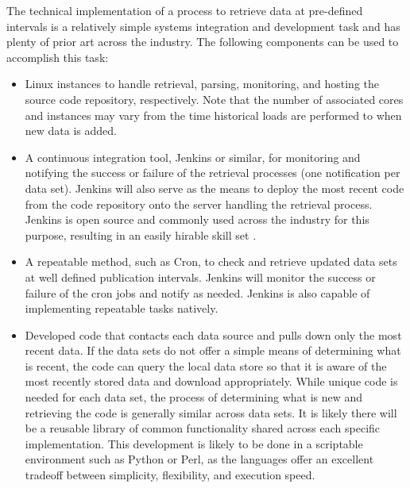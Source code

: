 The technical implementation of a process to retrieve data at pre-defined intervals is a relatively simple systems integration and development task and has plenty of prior art across the industry. The following components can be used to accomplish this task:
\begin{itemize}
	\item Linux instances to handle retrieval, parsing, monitoring, and hosting the source code repository, respectively. Note that the number of associated cores and instances may vary from the time historical loads are performed to when new data is added.
	\item A continuous integration tool, Jenkins or similar, for monitoring and notifying the success or failure of the retrieval processes (one notification per data set). Jenkins will also serve as the means to deploy the most recent code from the code repository onto the server handling the retrieval process. Jenkins is open source and commonly used across the industry for this purpose, resulting in an easily hirable skill set \cite{jenkins}.
	\item A repeatable method, such as Cron, to check and retrieve updated data sets at well defined publication intervals. Jenkins will monitor the success or failure of the cron jobs and notify as needed. Jenkins is also capable of implementing repeatable tasks natively.
	\item Developed code that contacts each data source and pulls down only the most recent data. If the data sets do not offer a simple means of determining what is recent, the code can query the local data store so that it is aware of the most recently stored data and download appropriately. While unique code is needed for each data set, the process of determining what is new and retrieving the code is generally similar across data sets. It is likely there will be a reusable library of common functionality shared across each specific implementation. This development is likely to be done in a scriptable environment such as Python or Perl, as the languages offer an excellent tradeoff between simplicity, flexibility, and execution speed.
\end{itemize}
